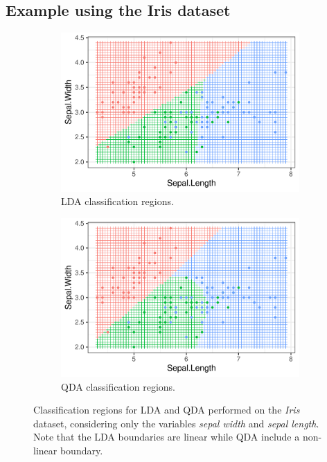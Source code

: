 \documentclass[aspectratio=169,10pt]{beamer}
\begin{document}
\subsection{Example using the Iris dataset}
\begin{frame}{\secname}{\subsecname}
  \begin{figure}
    \centering
    \begin{subfigure}[b]{0.45\textwidth}
      \includegraphics[width=\textwidth]{scripts/output/lda_regions.pdf}
      \caption{LDA classification regions.}
    \end{subfigure}
    \hfill
    \begin{subfigure}[b]{0.45\textwidth}
      \includegraphics[width=\textwidth]{scripts/output/qda_regions.pdf}
      \caption{QDA classification regions.}
    \end{subfigure}
    \caption{Classification regions for LDA and QDA performed on the \textit{Iris} dataset, considering only the variables \textit{sepal width} and \textit{sepal length}.
    Note that the LDA boundaries are linear while QDA include a non-linear boundary.}
  \end{figure}
\end{frame}
\end{document}
